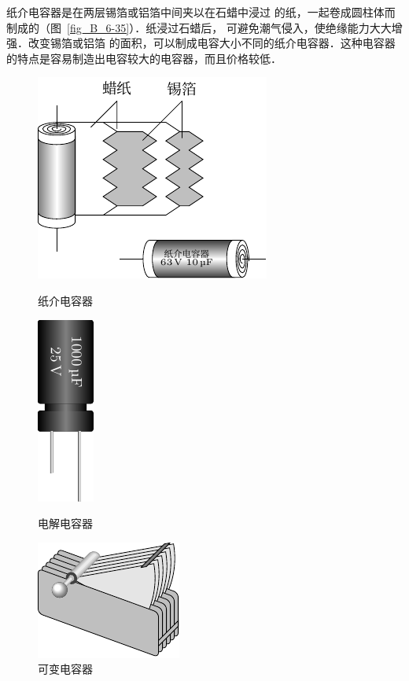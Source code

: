纸介电容器是在两层锡箔或铝箔中间夹以在石蜡中浸过
的纸，一起卷成圆柱体而制成的（图~\ref{fig_B_6-35}）．纸浸过石蜡后，
可避免潮气侵入，使绝缘能力大大增强．改变锡箔或铝箔
的面积，可以制成电容大小不同的纸介电容器．这种电容器
的特点是容易制造出电容较大的电容器，而且价格较低．
\begin{figure}[htbp]
    \centering
    \begin{minipage}[t]{0.35\textwidth}
        \centering
        \includegraphics{fig/B/6-35.pdf}
        \caption{纸介电容器}\label{fig_B_6-35}
    \end{minipage}
    \begin{minipage}[t]{0.3\textwidth}
        \centering
        \includegraphics{fig/B/6-36.pdf}
        \caption{电解电容器}\label{fig_B_6-36}
    \end{minipage}
    \begin{minipage}[t]{0.3\textwidth}
    	\centering
    	\includegraphics{fig/B/6-37.pdf}
    	\caption{可变电容器}\label{fig_B_6-37}
    \end{minipage}
\end{figure}

